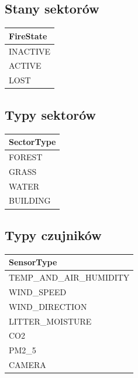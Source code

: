 \subsection{Stany sektorów}

\begin{longtable}{|l|}
\hline
\textbf{FireState} \\
\hline
INACTIVE \\
\hline
ACTIVE \\
\hline
LOST \\
\hline
\end{longtable}

\subsection{Typy sektorów}

\begin{longtable}{|l|}
\hline
\textbf{SectorType} \\
\hline
FOREST \\
\hline
GRASS \\
\hline
WATER \\
\hline
BUILDING \\
\hline
\end{longtable}

\subsection{Typy czujników}

\begin{longtable}{|l|}
\hline
\textbf{SensorType} \\
\hline
TEMP\_AND\_AIR\_HUMIDITY \\
\hline
WIND\_SPEED \\
\hline
WIND\_DIRECTION \\
\hline
LITTER\_MOISTURE \\
\hline
CO2 \\
\hline
PM2\_5 \\
\hline
CAMERA \\
\hline
\end{longtable}

